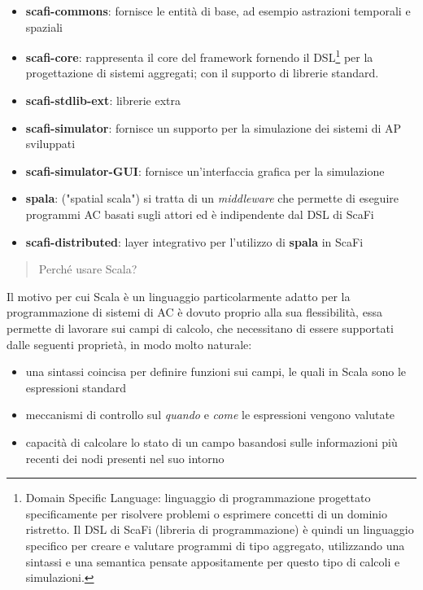 \documentclass[12pt,a4paper,openright,twoside]{book}
\begin{document}
\begin{itemize}
    \item \textbf{scafi-commons}: fornisce le entità di base, ad esempio astrazioni temporali e spaziali
    \item \textbf{scafi-core}: rappresenta il core del framework fornendo il DSL\footnote{Domain Specific Language: linguaggio di programmazione progettato specificamente per risolvere problemi o esprimere concetti di un dominio ristretto. Il DSL di ScaFi (libreria di programmazione) è quindi un linguaggio specifico per creare e valutare programmi di tipo aggregato, utilizzando una sintassi e una semantica pensate appositamente per questo tipo di calcoli e simulazioni.} per la progettazione di sistemi aggregati; con il supporto di librerie standard.
    \item \textbf{scafi-stdlib-ext}: librerie extra
    \item \textbf{scafi-simulator}: fornisce un supporto per la simulazione dei sistemi di \ac{AP} sviluppati
    \item \textbf{scafi-simulator-GUI}: fornisce un'interfaccia grafica per la simulazione
    \item \textbf{spala}: ("spatial scala") si tratta di un \textit{middleware} che permette di eseguire programmi \ac{AC} basati sugli attori ed è indipendente dal DSL di ScaFi
    \item \textbf{scafi-distributed}: layer integrativo per l'utilizzo di \textbf{spala} in ScaFi
\end{itemize}

\begin{quote}
    \centering
    Perché usare Scala?
\end{quote}

Il motivo per cui Scala è un linguaggio particolarmente adatto per la programmazione di sistemi di \ac{AC} è dovuto proprio alla sua flessibilità, essa permette di lavorare sui campi di calcolo, che necessitano di essere supportati dalle seguenti proprietà, in modo molto naturale:

\begin{itemize}
    \item una sintassi coincisa per definire funzioni sui campi, le quali in Scala sono le espressioni standard
    \item meccanismi di controllo sul \textit{quando} e \textit{come} le espressioni vengono valutate
    \item capacità di calcolare lo stato di un campo basandosi sulle informazioni più recenti dei nodi presenti nel suo intorno
\end{itemize}
\end{document}
